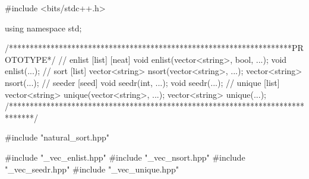 #include <bits/stdc++.h>

using namespace std;

/********************************************************************PROTOTYPE*/
// enlist [list] [neat]
void enlist(vector<string>, bool, ...);
void enlist(...);
// sort [list]
vector<string> nsort(vector<string>, ...);
vector<string> nsort(...);
// seeder [seed]
void seedr(int, ...);
void seedr(...);
// unique [list]
vector<string> unique(vector<string>, ...);
vector<string> unique(...);
/******************************************************************************/

#include "natural_sort.hpp"

#include "_vec_enlist.hpp"
#include "_vec_nsort.hpp"
#include "_vec_seedr.hpp"
#include "_vec_unique.hpp"

